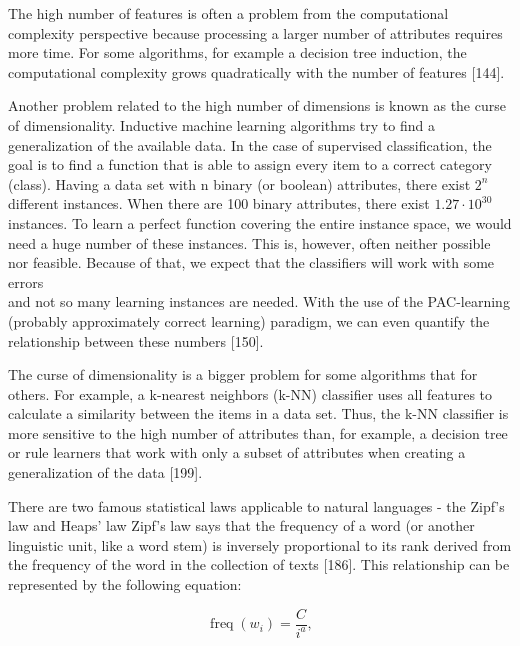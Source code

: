 \documentclass[10pt]{book}
\begin{document}
The high number of features is often a problem from the computational complexity perspective because processing a larger number of attributes requires more time. For some algorithms, for example a decision tree induction, the computational complexity grows quadratically with the number of features [144].

Another problem related to the high number of dimensions is known as the curse of dimensionality. Inductive machine learning algorithms try to find a generalization of the available data. In the case of supervised classification, the goal is to find a function that is able to assign every item to a correct category (class). Having a data set with n binary (or boolean) attributes, there exist $2^{n}$ different instances. When there are 100 binary attributes, there exist $1.27 \cdot 10^{30}$ instances. To learn a perfect function covering the entire instance space, we would need a huge number of these instances. This is, however, often neither possible nor feasible. Because of that, we expect that the classifiers will work with some errors\\[0pt]
and not so many learning instances are needed. With the use of the PAC-learning (probably approximately correct learning) paradigm, we can even quantify the relationship between these numbers [150].

The curse of dimensionality is a bigger problem for some algorithms that for others. For example, a k-nearest neighbors (k-NN) classifier uses all features to calculate a similarity between the items in a data set. Thus, the k-NN classifier is more sensitive to the high number of attributes than, for example, a decision tree or rule learners that work with only a subset of attributes when creating a generalization of the data [199].

There are two famous statistical laws applicable to natural languages - the Zipf's law and Heaps' law Zipf's law says that the frequency of a word (or another linguistic unit, like a word stem) is inversely proportional to its rank derived from the frequency of the word in the collection of texts [186]. This relationship can be represented by the following equation:


\begin{equation*}
\operatorname{freq}\left(w_{i}\right)=\frac{C}{i^{a}}, \tag{3.1}
\end{equation*}
\end{document}

